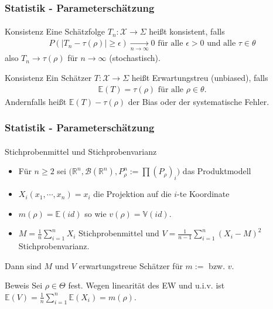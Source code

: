 \documentclass{beamer}
\begin{document}
\begin{frame}
    \frametitle{Statistik - Parameterschätzung}
\framesubtitle{}

\begin{block}{Konsistenz}
Eine Schätzfolge $T_n: \mathcal{X} \to \Sigma$  heißt konsistent, falls
\begin{align*}
P( |T_n - \tau(\rho)  |  \geq \epsilon)  \underset {n \to \infty}{\longrightarrow} 0 \text{ für alle } \epsilon > 0 \text { und alle } \tau \in \theta  
\end{align*}
also $T_n \to \tau(\rho)$ für $n \to \infty$  (stochastisch).
\end{block}
\begin{block}{Konsistenz}
Ein Schätzer $T: \mathcal{X} \to \Sigma$  heißt Erwartungstreu (unbiased), falls
\begin{align*}
\mathbb{E}(T) = \tau(\rho) \text{ für alle } \rho \in \theta.
\end{align*}
Andernfalls heißt $\mathbb{E}(T) - \tau(\rho) $ der Bias oder der systematische Fehler.
\end{block}
 \end{frame}

\begin{frame}
    \frametitle{Statistik - Parameterschätzung}
\framesubtitle{}
\begin{block}{Stichprobenmittel und  Stichprobenvarianz}
\begin{itemize}
\item Für $n \geq 2$ sei  $\biggl ( \mathbb{R}^n, \mathcal{B}(\mathbb{R}^n ), P^n_\rho :=  \prod (P_\rho)_i \biggr)$ das Produktmodell
\item $X_i(x_1, \cdots , x_n) = x_i$ die Projektion auf die $i$-te Koordinate  
\item $m(\rho) =  \mathbb{E}(id) $ so wie $v(\rho) =\mathbb{V}(id)$. 
\item  $M= \frac{1}{n} \sum_{i=1}^n X_i$ Stichprobenmittel  und $V= \frac{1}{n-1} \sum_{i=1}^n (X_i - M)^2$ Stichprobenvarianz.
\end{itemize}

 Dann sind $M$  und $V$ erwartungstreue Schätzer für $m:=$ bzw. $v$.

\end{block}

\begin{block}{Beweis}
Sei $\rho \in \Theta$ fest. Wegen linearität des EW und u.i.v. ist $\mathbb{E}(V) =\frac{1}{n} \sum_{i=1}^n \mathbb{E}(X_i) = m(\rho) $.
\end{block}


 \end{frame}
\end{document}
